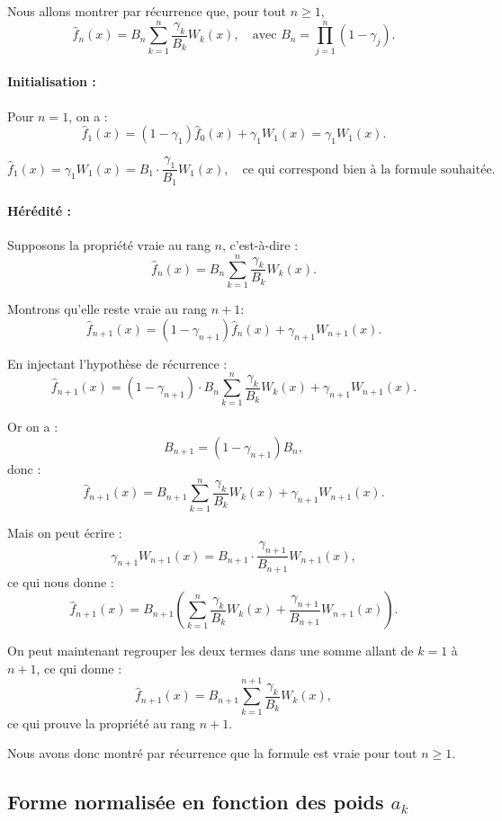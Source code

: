 \documentclass[12pt]{article}
\begin{document}
Nous allons montrer par récurrence que, pour tout \( n \geq 1 \),
\[
\hat{f}_n(x) = B_n \sum_{k=1}^{n} \frac{\gamma_k}{B_k} W_k(x),
\quad \text{avec } B_n = \prod_{j=1}^n (1 - \gamma_j).
\]

\paragraph{Initialisation :} Pour \( n = 1 \), on a :
\[
\hat{f}_1(x) = (1 - \gamma_1)\hat{f}_0(x) + \gamma_1 W_1(x) = \gamma_1 W_1(x).
\]

\[
\hat{f}_1(x) = \gamma_1 W_1(x) = B_1 \cdot \frac{\gamma_1}{B_1} W_1(x),
\quad \text{ce qui correspond bien à la formule souhaitée.}
\]

\paragraph{Hérédité :} Supposons la propriété vraie au rang \( n \), c’est-à-dire :
\[
\hat{f}_n(x) = B_n \sum_{k=1}^{n} \frac{\gamma_k}{B_k} W_k(x).
\]

Montrons qu’elle reste vraie au rang \( n+1 \):
\[
\hat{f}_{n+1}(x) = (1 - \gamma_{n+1}) \hat{f}_n(x) + \gamma_{n+1} W_{n+1}(x).
\]

En injectant l’hypothèse de récurrence :
\[
\hat{f}_{n+1}(x) = (1 - \gamma_{n+1}) \cdot B_n \sum_{k=1}^{n} \frac{\gamma_k}{B_k} W_k(x) + \gamma_{n+1} W_{n+1}(x).
\]

Or on a :
\[
B_{n+1} = (1 - \gamma_{n+1}) B_n,
\]
donc :
\[
\hat{f}_{n+1}(x) = B_{n+1} \sum_{k=1}^{n} \frac{\gamma_k}{B_k} W_k(x) + \gamma_{n+1} W_{n+1}(x).
\]

Mais on peut écrire :
\[
\gamma_{n+1} W_{n+1}(x) = B_{n+1} \cdot \frac{\gamma_{n+1}}{B_{n+1}} W_{n+1}(x),
\]
ce qui nous donne :
\[
\hat{f}_{n+1}(x) = B_{n+1} \left( \sum_{k=1}^{n} \frac{\gamma_k}{B_k} W_k(x) + \frac{\gamma_{n+1}}{B_{n+1}} W_{n+1}(x) \right).
\]

On peut maintenant regrouper les deux termes dans une somme allant de \( k = 1 \) à \( n+1 \), ce qui donne :
\[
\hat{f}_{n+1}(x) = B_{n+1} \sum_{k=1}^{n+1} \frac{\gamma_k}{B_k} W_k(x),
\]
ce qui prouve la propriété au rang \( n+1 \).

Nous avons donc montré par récurrence que la formule est vraie pour tout \( n \geq 1 \).

\subsection{Forme normalisée en fonction des poids \( a_k \)}
\end{document}
